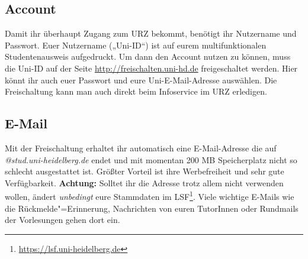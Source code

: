 \subsection*{Account}
Damit ihr überhaupt Zugang zum URZ bekommt, benötigt ihr Nutzername
und Passwort. Euer Nutzername („Uni-ID“) ist auf eurem multifunktionalen Studentenausweis aufgedruckt.
Um dann den Account nutzen zu können, muss die Uni-ID auf der Seite \url{http://freischalten.uni-hd.de} freigeschaltet werden. Hier könnt ihr auch euer Passwort und eure Uni-E-Mail-Adresse auswählen.
Die Freischaltung kann man auch direkt beim Infoservice im URZ erledigen.

\subsection*{E-Mail}
Mit der Freischaltung erhaltet ihr automatisch eine E-Mail-Adresse die auf \emph{@stud.uni-heidelberg.de} endet und mit momentan 200 MB Speicherplatz nicht so schlecht ausgestattet ist. Größter Vorteil ist ihre Werbefreiheit und sehr gute Verfügbarkeit. \textbf{Achtung:} Solltet ihr die Adresse trotz allem nicht verwenden wollen, ändert \emph{unbedingt} eure Stammdaten im LSF\footnote{\url{https://lsf.uni-heidelberg.de}}. Viele wichtige E-Mails wie die Rückmelde"=Erinnerung, Nachrichten von euren TutorInnen oder Rundmails der Vorlesungen gehen dort ein.

